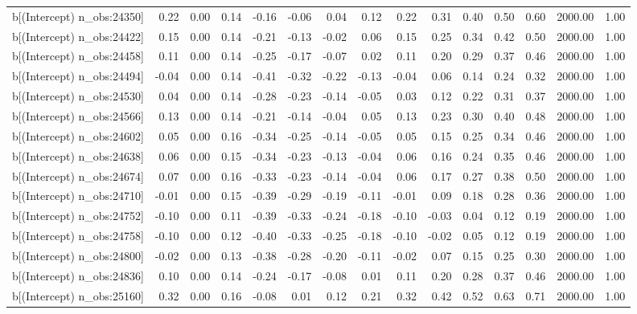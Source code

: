 \begin{table}[ht]
\begin{tabular}{rrrrrrrrrrrrrrr}
  b[(Intercept) n\_obs:24350] & 0.22 & 0.00 & 0.14 & -0.16 & -0.06 & 0.04 & 0.12 & 0.22 & 0.31 & 0.40 & 0.50 & 0.60 & 2000.00 & 1.00 \\ 
  b[(Intercept) n\_obs:24422] & 0.15 & 0.00 & 0.14 & -0.21 & -0.13 & -0.02 & 0.06 & 0.15 & 0.25 & 0.34 & 0.42 & 0.50 & 2000.00 & 1.00 \\ 
  b[(Intercept) n\_obs:24458] & 0.11 & 0.00 & 0.14 & -0.25 & -0.17 & -0.07 & 0.02 & 0.11 & 0.20 & 0.29 & 0.37 & 0.46 & 2000.00 & 1.00 \\ 
  b[(Intercept) n\_obs:24494] & -0.04 & 0.00 & 0.14 & -0.41 & -0.32 & -0.22 & -0.13 & -0.04 & 0.06 & 0.14 & 0.24 & 0.32 & 2000.00 & 1.00 \\ 
  b[(Intercept) n\_obs:24530] & 0.04 & 0.00 & 0.14 & -0.28 & -0.23 & -0.14 & -0.05 & 0.03 & 0.12 & 0.22 & 0.31 & 0.37 & 2000.00 & 1.00 \\ 
  b[(Intercept) n\_obs:24566] & 0.13 & 0.00 & 0.14 & -0.21 & -0.14 & -0.04 & 0.05 & 0.13 & 0.23 & 0.30 & 0.40 & 0.48 & 2000.00 & 1.00 \\ 
  b[(Intercept) n\_obs:24602] & 0.05 & 0.00 & 0.16 & -0.34 & -0.25 & -0.14 & -0.05 & 0.05 & 0.15 & 0.25 & 0.34 & 0.46 & 2000.00 & 1.00 \\ 
  b[(Intercept) n\_obs:24638] & 0.06 & 0.00 & 0.15 & -0.34 & -0.23 & -0.13 & -0.04 & 0.06 & 0.16 & 0.24 & 0.35 & 0.46 & 2000.00 & 1.00 \\ 
  b[(Intercept) n\_obs:24674] & 0.07 & 0.00 & 0.16 & -0.33 & -0.23 & -0.14 & -0.04 & 0.06 & 0.17 & 0.27 & 0.38 & 0.50 & 2000.00 & 1.00 \\ 
  b[(Intercept) n\_obs:24710] & -0.01 & 0.00 & 0.15 & -0.39 & -0.29 & -0.19 & -0.11 & -0.01 & 0.09 & 0.18 & 0.28 & 0.36 & 2000.00 & 1.00 \\ 
  b[(Intercept) n\_obs:24752] & -0.10 & 0.00 & 0.11 & -0.39 & -0.33 & -0.24 & -0.18 & -0.10 & -0.03 & 0.04 & 0.12 & 0.19 & 2000.00 & 1.00 \\ 
  b[(Intercept) n\_obs:24758] & -0.10 & 0.00 & 0.12 & -0.40 & -0.33 & -0.25 & -0.18 & -0.10 & -0.02 & 0.05 & 0.12 & 0.19 & 2000.00 & 1.00 \\ 
  b[(Intercept) n\_obs:24800] & -0.02 & 0.00 & 0.13 & -0.38 & -0.28 & -0.20 & -0.11 & -0.02 & 0.07 & 0.15 & 0.25 & 0.30 & 2000.00 & 1.00 \\ 
  b[(Intercept) n\_obs:24836] & 0.10 & 0.00 & 0.14 & -0.24 & -0.17 & -0.08 & 0.01 & 0.11 & 0.20 & 0.28 & 0.37 & 0.46 & 2000.00 & 1.00 \\ 
  b[(Intercept) n\_obs:25160] & 0.32 & 0.00 & 0.16 & -0.08 & 0.01 & 0.12 & 0.21 & 0.32 & 0.42 & 0.52 & 0.63 & 0.71 & 2000.00 & 1.00 \\ 

\end{tabular}
\end{table}
